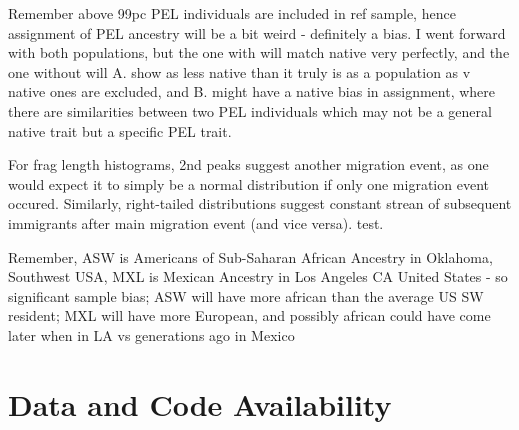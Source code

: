 \documentclass[11pt]{article}
\begin{document}
Remember above 99pc PEL individuals are included in ref sample, hence assignment of PEL ancestry will be a bit weird - definitely a bias. I went forward with both populations, but the one with will match native very perfectly, and the one without will A. show as less native than it truly is as a population as v native ones are excluded, and B. might have a native bias in assignment, where there are similarities between two PEL individuals which may not be a general native trait but a specific PEL trait. 


For frag length histograms, 2nd peaks suggest another migration event, as one would expect it to simply be a normal distribution if only one migration event occured. Similarly, right-tailed distributions suggest constant strean of subsequent immigrants after main migration event (and vice versa). test.



Remember, ASW is Americans of Sub-Saharan African Ancestry in Oklahoma, Southwest USA, MXL is Mexican Ancestry in Los Angeles CA United States - so significant sample bias; ASW will have more african than the average US SW resident; MXL will have more European, and possibly african could have come later when in LA vs generations ago in Mexico























\section{Data and Code Availability}
\end{document}
